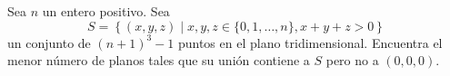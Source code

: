 Sea $n$ un entero positivo. Sea
\[ S = \left\{ (x,y,z) \mid x,y,z \in \{ 0, 1, \ldots, n\}, x + y + z > 0 \right \} \]
un conjunto de $ (n + 1)^{3} - 1$ puntos en el plano tridimensional. Encuentra el menor número de planos tales que su unión contiene a $S$ pero no a $(0,0,0)$.
